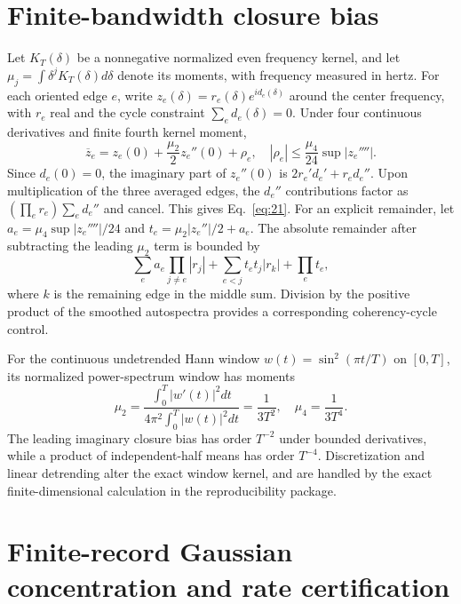 \section{Finite-bandwidth closure bias}\label{app:band}
Let $K_T(\delta)$ be a nonnegative normalized even frequency kernel, and let $\mu_j=\int\delta^j K_T(\delta)d\delta$ denote its moments, with frequency measured in hertz. For each oriented edge $e$, write $z_e(\delta)=r_e(\delta)e^{id_e(\delta)}$ around the center frequency, with $r_e$ real and the cycle constraint $\sum_ed_e(\delta)=0$. Under four continuous derivatives and finite fourth kernel moment,
\begin{equation}
 \overline z_e=z_e(0)+\frac{\mu_2}{2}z_e''(0)+\rho_e,
 \quad|\rho_e|\le \frac{\mu_4}{24}\sup|z_e''''|.
\end{equation}
Since $d_e(0)=0$, the imaginary part of $z_e''(0)$ is $2r_e'd_e'+r_ed_e''$. Upon multiplication of the three averaged edges, the $d_e''$ contributions factor as $(\prod_e r_e)\sum_e d_e''$ and cancel. This gives Eq.~\eqref{eq:21}. For an explicit remainder, let $a_e=\mu_4\sup|z_e''''|/24$ and $t_e=\mu_2|z_e''|/2+a_e$. The absolute remainder after subtracting the leading $\mu_2$ term is bounded by
\begin{equation}
 \sum_e a_e\prod_{j\ne e}|r_j|+
 \sum_{e<j}t_et_j|r_k|+\prod_e t_e,
\end{equation}
where $k$ is the remaining edge in the middle sum. Division by the positive product of the smoothed autospectra provides a corresponding coherency-cycle control.

For the continuous undetrended Hann window $w(t)=\sin^2(\pi t/T)$ on $[0,T]$, its normalized power-spectrum window has moments
\begin{equation}
 \mu_2=\frac{\int_0^T|w'(t)|^2dt}{4\pi^2\int_0^T|w(t)|^2dt}=\frac1{3T^2},
 \quad\mu_4=\frac1{3T^4}.
\end{equation}
The leading imaginary closure bias has order $T^{-2}$ under bounded derivatives, while a product of independent-half means has order $T^{-4}$. Discretization and linear detrending alter the exact window kernel, and are handled by the exact finite-dimensional calculation in the reproducibility package.

\section{Finite-record Gaussian concentration and rate certification}\label{app:finite}
